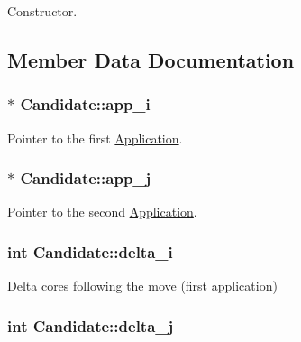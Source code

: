 Constructor. 



\subsection{Member Data Documentation}
\hypertarget{classCandidate_a1bfed0429bba41f57dce0fbd37225c2c}{
\subsubsection[{app\-\_\-i}]{$\ast$ Candidate\-::app\-\_\-i}}\label{classCandidate_a1bfed0429bba41f57dce0fbd37225c2c}


Pointer to the first \hyperlink{classApplication}{Application}. 

\hypertarget{classCandidate_a8b0f26e8b45e9a3331be8a9694d3be5e}{
\subsubsection[{app\-\_\-j}]{$\ast$ Candidate\-::app\-\_\-j}}\label{classCandidate_a8b0f26e8b45e9a3331be8a9694d3be5e}


Pointer to the second \hyperlink{classApplication}{Application}. 

\hypertarget{classCandidate_ab1033e1f3e0060f0773c7d9268c2ce0b}{
\subsubsection[{delta\-\_\-i}]{\setlength{\rightskip}{0pt plus 5cm}int Candidate\-::delta\-\_\-i}}\label{classCandidate_ab1033e1f3e0060f0773c7d9268c2ce0b}


Delta cores following the move (first application) 

\hypertarget{classCandidate_a02528143e2448bfcad797aae2fe1ac90}{
\subsubsection[{delta\-\_\-j}]{\setlength{\rightskip}{0pt plus 5cm}int Candidate\-::delta\-\_\-j}}\label{classCandidate_a02528143e2448bfcad797aae2fe1ac90}


